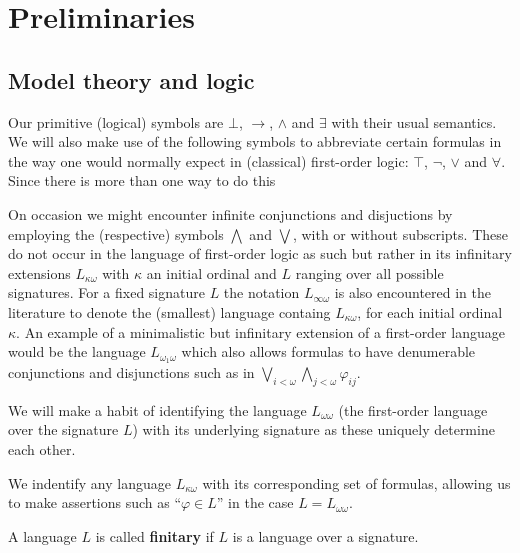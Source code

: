 \chapter{Preliminaries}


\section{Model theory and logic}

Our primitive (logical) symbols are $\bot$, $\rightarrow$, $\wedge$ and $\exists$ with their usual semantics.  We will also make use of the following symbols to abbreviate certain formulas in the way one would normally expect in (classical) first-order logic: $\top$, $\neg$, $\vee$ and $\forall$.  Since there is more than one way to do this

On occasion we might encounter infinite conjunctions and disjuctions by employing the (respective) symbols $\bigwedge$ and $\bigvee$, with or without subscripts.  These do not occur in the language of first-order logic as such but rather in its infinitary extensions $L_{\kappa\omega}$ with $\kappa$ an initial ordinal and $L$ ranging over all possible signatures.  For a fixed signature $L$ the notation $L_{\infty\omega}$ is also encountered in the literature to denote the (smallest) language containg $L_{\kappa\omega}$, for each initial ordinal $\kappa$.  An example of a minimalistic but infinitary extension of a first-order language would be the language $L_{\omega_1\omega}$ which also allows formulas to have denumerable conjunctions and disjunctions such as in $\bigvee_{i<\omega}\bigwedge_{j<\omega}\varphi_{ij}$.

\begin{conv}
	We will make a habit of identifying the language $L_{\omega\omega}$ (the first-order language over the signature $L$) with its underlying signature as these uniquely determine each other.
\end{conv}

\begin{conv}
	We indentify any language $L_{\kappa\omega}$ with its corresponding set of formulas, allowing us to make assertions such as ``$\varphi\in L$'' in the case $L=L_{\omega\omega}$.
\end{conv}

\begin{dfn}
	A language $L$ is called \textbf{finitary} if $L$ is a language over a  signature.
\end{dfn}

